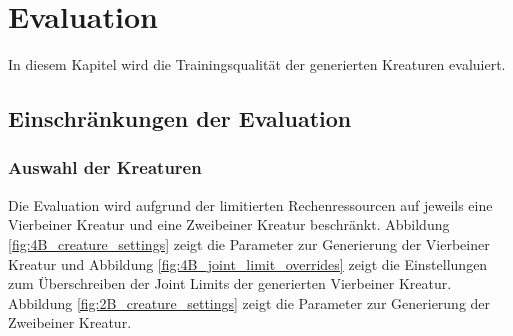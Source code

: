 \chapter{Evaluation}
\label{chap:evaluation}
In diesem Kapitel wird die Trainingsqualität der generierten Kreaturen evaluiert. 

\section{Einschränkungen der Evaluation}

\subsection{Auswahl der Kreaturen}
Die Evaluation wird aufgrund der limitierten Rechenressourcen auf jeweils eine Vierbeiner Kreatur und eine Zweibeiner Kreatur beschränkt. Abbildung \ref{fig:4B_creature_settings} zeigt die Parameter zur Generierung der Vierbeiner Kreatur und Abbildung \ref{fig:4B_joint_limit_overrides} zeigt die Einstellungen zum Überschreiben der Joint Limits der generierten Vierbeiner Kreatur. Abbildung \ref{fig:2B_creature_settings} zeigt die Parameter zur Generierung der Zweibeiner Kreatur.

